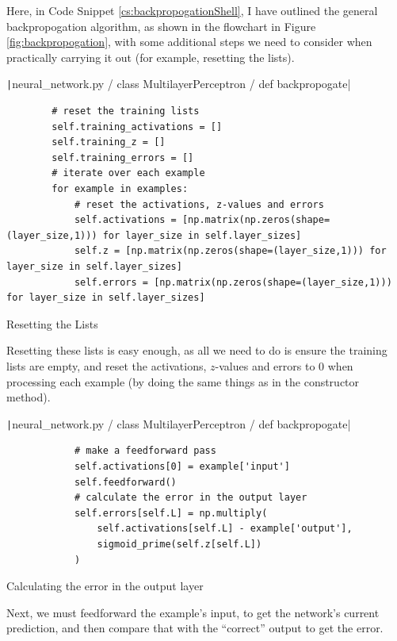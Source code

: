 \documentclass[12pt]{report}
\newcommand{\pil}[1]{\protect\texttt|#1|}
\begin{document}
Here, in Code Snippet \ref{cs:backpropogationShell}, I have outlined the general backpropogation algorithm, as shown in the flowchart in Figure \ref{fig:backpropogation}, with some additional steps we need to consider when practically carrying it out (for example, resetting the lists).

\begin{listing}[H]
\pil{neural_network.py / class MultilayerPerceptron / def backpropogate}
\begin{verbatim}
        # reset the training lists
        self.training_activations = []
        self.training_z = []
        self.training_errors = []
        # iterate over each example
        for example in examples:
            # reset the activations, z-values and errors
            self.activations = [np.matrix(np.zeros(shape=(layer_size,1))) for layer_size in self.layer_sizes]
            self.z = [np.matrix(np.zeros(shape=(layer_size,1))) for layer_size in self.layer_sizes]
            self.errors = [np.matrix(np.zeros(shape=(layer_size,1))) for layer_size in self.layer_sizes]
\end{verbatim}
\caption{Resetting the Lists}\label{cs:backpropogationResetLists}
\end{listing}

Resetting these lists is easy enough, as all we need to do is ensure the training lists are empty, and reset the activations, $z$-values and errors to 0 when processing each example (by doing the same things as in the constructor method).

\begin{listing}[H]
\pil{neural_network.py / class MultilayerPerceptron / def backpropogate}
\begin{verbatim}
            # make a feedforward pass
            self.activations[0] = example['input']
            self.feedforward()
            # calculate the error in the output layer
            self.errors[self.L] = np.multiply(
                self.activations[self.L] - example['output'],
                sigmoid_prime(self.z[self.L])
            )
\end{verbatim}
\caption{Calculating the error in the output layer}\label{cs:backpropogationOutputLayer}
\end{listing}

Next, we must feedforward the example's input, to get the network's current prediction, and then compare that with the ``correct'' output to get the error.
\end{document}
